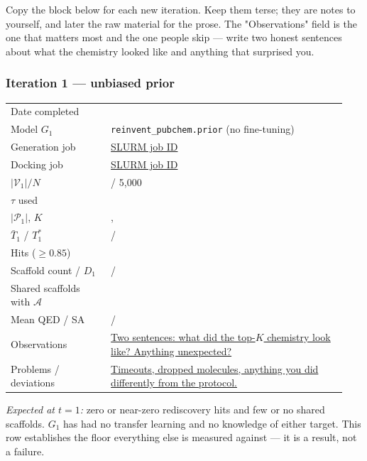 \documentclass[11pt]{article}
\newcommand{\FILL}[1]{\textcolor{blue!65!black}{\underline{\textsf{#1}}}}
\newcommand{\Gmodel}{G}                         %
\newcommand{\Actives}{\mathcal{A}}              %
\newcommand{\Valid}{\mathcal{V}}                %
\newcommand{\Passed}{\mathcal{P}}               %
\newcommand{\Tbar}{\bar{T}}
\newcommand{\Tstar}{T^{*}}
\newcommand{\Ngen}{N}
\newcommand{\Kk}{K}
\begin{document}
\begin{guide}
Copy the block below for each new iteration. Keep them terse; they are notes to
yourself, and later the raw material for the prose. The "Observations" field is
the one that matters most and the one people skip --- write two honest sentences
about what the chemistry looked like and anything that surprised you.
\end{guide}

\subsubsection*{Iteration 1 --- unbiased prior}
\begin{guide}[Log]
\begin{tabular}{@{}p{0.28\linewidth}p{0.66\linewidth}@{}}
Date completed        & \FILL{} \\
Model $\Gmodel_1$     & \texttt{reinvent\_pubchem.prior} (no fine-tuning) \\
Generation job        & \FILL{SLURM job ID} \\
Docking job           & \FILL{SLURM job ID} \\
$|\Valid_1| / \Ngen$  & \FILL{} / 5{,}000 \\
$\tau$ used           & \FILL{} \\
$|\Passed_1|$, $\Kk$  & \FILL{} , \FILL{} \\
$\Tbar_1$ / $\Tstar_1$& \FILL{} / \FILL{} \\
Hits ($\ge 0.85$)     & \FILL{} \\
Scaffold count / $D_1$& \FILL{} / \FILL{} \\
Shared scaffolds with $\Actives$ & \FILL{} \\
Mean QED / SA         & \FILL{} / \FILL{} \\
Observations          & \FILL{Two sentences: what did the top-$\Kk$ chemistry
                        look like? Anything unexpected?} \\
Problems / deviations & \FILL{Timeouts, dropped molecules, anything you did
                        differently from the protocol.} \\
\end{tabular}
\smallskip

\emph{Expected at $t=1$:} zero or near-zero rediscovery hits and few or no
shared scaffolds. $\Gmodel_1$ has had no transfer learning and no knowledge of
either target. This row establishes the floor everything else is measured
against --- it is a result, not a failure.
\end{guide}
\end{document}
